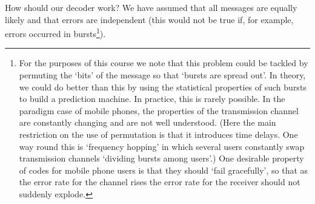 \documentclass[12pt,a4paper]{article}
\theoremstyle{plain}
\theoremstyle{definition}
\begin{document}
    How should our decoder work? We have assumed that
    all messages are equally likely and that errors
    are independent (this would not be true if, for
    example, errors occurred in bursts\footnote{For
    the purposes of this course we note
    that this problem could
    be tackled by permuting the `bits' of the message
    so that `bursts are spread out'. In theory, we
    could do better than this by using
    the statistical properties of such bursts
    to build a prediction machine.
    In practice, this is rarely possible.
    In the paradigm case of mobile phones,
    the properties of the transmission channel
    are constantly changing and are not well understood.
    (Here the main restriction on the use of permutation
    is that it introduces time delays. One way round this
    is `frequency hopping' in which several users
    constantly swap transmission channels `dividing
    bursts among users'.) One desirable property of
    codes for mobile phone users is that they should
    `fail gracefully', so that as the error rate
    for the channel rises the error rate for the receiver
    should not suddenly explode.}).
\end{document}
